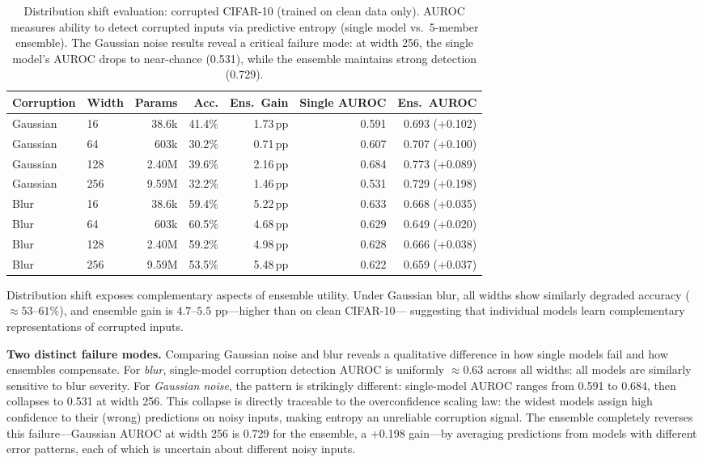 \documentclass[11pt]{article}
\begin{document}
\begin{table}[h]
\centering
\small
\begin{tabular}{llrrrrr}
\toprule
Corruption & Width & Params & Acc. & Ens.\ Gain & Single AUROC & Ens.\ AUROC\\
\midrule
Gaussian & 16  & 38.6k & 41.4\% & 1.73\,pp & 0.591 & 0.693 (+0.102)\\
Gaussian & 64  & 603k  & 30.2\% & 0.71\,pp & 0.607 & 0.707 (+0.100)\\
Gaussian & 128 & 2.40M & 39.6\% & 2.16\,pp & 0.684 & 0.773 (+0.089)\\
Gaussian & 256 & 9.59M & 32.2\% & 1.46\,pp & 0.531 & 0.729 (+0.198)\\
\midrule
Blur     & 16  & 38.6k & 59.4\% & 5.22\,pp & 0.633 & 0.668 (+0.035)\\
Blur     & 64  & 603k  & 60.5\% & 4.68\,pp & 0.629 & 0.649 (+0.020)\\
Blur     & 128 & 2.40M & 59.2\% & 4.98\,pp & 0.628 & 0.666 (+0.038)\\
Blur     & 256 & 9.59M & 53.5\% & 5.48\,pp & 0.622 & 0.659 (+0.037)\\
\bottomrule
\end{tabular}
\caption{Distribution shift evaluation: corrupted CIFAR-10 (trained on clean data only).
AUROC measures ability to detect corrupted inputs via predictive entropy (single model
vs.\ 5-member ensemble).  The Gaussian noise results reveal a critical failure mode:
at width 256, the single model's AUROC drops to near-chance (0.531), while the
ensemble maintains strong detection (0.729).}
\label{tab:corrupted}
\end{table}

Distribution shift exposes complementary aspects of ensemble utility.
Under Gaussian blur, all widths show similarly degraded accuracy (${\approx}53$--$61\%$),
and ensemble gain is $4.7$--$5.5$ pp---higher than on clean CIFAR-10---
suggesting that individual models learn complementary representations of
corrupted inputs.

\textbf{Two distinct failure modes.}  Comparing Gaussian noise and blur
reveals a qualitative difference in how single models fail and how ensembles
compensate.  For \emph{blur}, single-model corruption detection AUROC is
uniformly ${\approx}0.63$ across all widths: all models are similarly sensitive
to blur severity.  For \emph{Gaussian noise}, the pattern is strikingly
different: single-model AUROC ranges from 0.591 to 0.684, then collapses to
0.531 at width 256.  This collapse is directly traceable to the overconfidence
scaling law: the widest models assign high confidence to their (wrong)
predictions on noisy inputs, making entropy an unreliable corruption signal.
The ensemble completely reverses this failure---Gaussian AUROC at width 256
is 0.729 for the ensemble, a +0.198 gain---by averaging predictions from
models with different error patterns, each of which is uncertain about
different noisy inputs.
\end{document}
